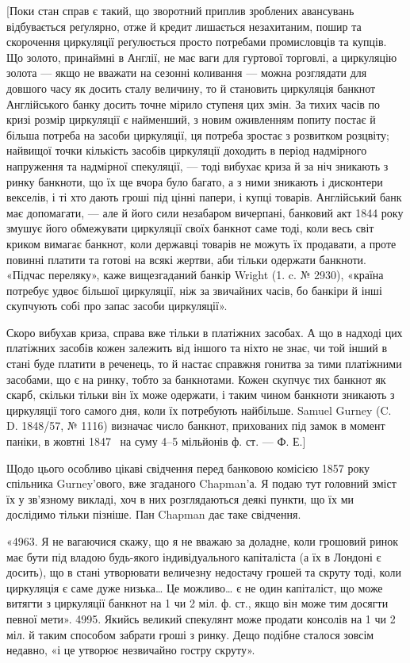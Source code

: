 
[Поки стан справ є такий, що зворотний приплив зроблених авансувань
відбувається реґулярно, отже й кредит лишається незахитаним, пошир та
скорочення циркуляції реґулюється просто потребами промисловців та купців. Що
золото, принаймні в Англії, не має ваги для гуртової торговлі, а циркуляцію
золота — якщо не вважати на сезонні коливання — можна розглядати для довшого
часу як досить сталу величину, то й становить циркуляція банкнот Англійського
банку досить точне мірило ступеня цих змін. За тихих часів по кризі розмір
циркуляції є найменший, з новим оживленням попиту постає й більша потреба
на засоби циркуляції, ця потреба зростає з розвитком розцвіту; найвищої точки
кількість засобів циркуляції доходить в період надмірного напруження та надмірної
спекуляції, — тоді вибухає криза й за ніч зникають з ринку банкноти,
що їх ще вчора було багато, а з ними зникають і дисконтери векселів, і ті хто
дають гроші під цінні папери, і купці товарів. Англійський банк має допомагати,
— але й його сили незабаром вичерпані, банковий акт 1844 року змушує
його обмежувати циркуляції своїх банкнот саме тоді, коли весь світ криком
вимагає банкнот, коли державці товарів не можуть їх продавати, а проте повинні
платити та готові на всякі жертви, аби тільки одержати банкноти. «Підчас
переляку», каже вищезгаданий банкір Wright (1. c. № 2930), «країна потребує
удвоє більшої циркуляції, ніж за звичайних часів, бо банкіри й інші скупчують
собі про запас засоби циркуляції».

Скоро вибухав криза, справа вже тільки в платіжних засобах. А що
в надході цих платіжних засобів кожен залежить від іншого та ніхто не знає,
чи той інший в стані буде платити в реченець, то й настає справжня гонитва
за тими платіжними засобами, що є на ринку, тобто за банкнотами. Кожен
скупчує тих банкнот як скарб, скільки тільки він їх може одержати, і таким
чином банкноти зникають з циркуляції того самого дня, коли їх потребують
найбільше. Samuel Gurney (C. D. 1848/57, № 1116) визначає число банкнот,
прихованих під замок в момент паніки, в жовтні 1847~ на суму 4--5 мільйонів
ф. ст. — Ф. Е.]

Щодо цього особливо цікаві свідчення перед банковою комісією 1857 року
спільника Gurney’ового, вже згаданого Chapman’а. Я подаю тут головний
зміст їх у зв’язному викладі, хоч в них розглядаються деякі пункти, що їх ми
дослідимо тільки пізніше. Пан Chapman дає таке свідчення.

«4963. Я не вагаючися скажу, що я не вважаю за доладне, коли грошовий
ринок має бути під владою будь-якого індивідуального капіталіста (а їх
в Лондоні є досить), що в стані утворювати величезну недостачу грошей та скруту
тоді, коли циркуляція є саме дуже низька\dots{} Це можливо\dots{} є не один капіталіст,
що може витягти з циркуляції банкнот на 1 чи 2 міл. ф. ст., якщо він
може тим досягти певної мети». 4995. Якийсь великий спекулянт може продати
консолів на 1 чи 2 міл. й таким способом забрати гроші з ринку. Дещо подібне
сталося зовсім недавно, «і це утворює незвичайно гостру скруту».

